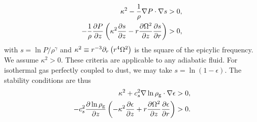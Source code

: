 \begin{align}
  \kappa^2 - \frac{1}{\rho}\nabla P \cdot \nabla s &> 0,\\
  -\frac{1}{\rho}\frac{\partial P}{\partial z} \left(\kappa^2 \frac{\partial s}{\partial z} -
  r\frac{\partial\Omega^2}{\partial z}\frac{\partial s}{\partial r}\right) &>0, 
\end{align}
with $s = \ln{P/\rho^\gamma}$ and 
$\kappa^2 \equiv r^{-3}\partial_r\left(r^4\Omega^2\right)$ is the
square of the epicylic frequency. We assume $\kappa^2>0$. 
These criteria are applicable to any adiabatic fluid. For 
isothermal gas perfectly coupled to dust, we may take 
$s=\ln{(1-\epsilon)}$. 
The stability conditions are thus
\begin{align}
  \kappa^2 + c_s^2 \nabla\ln{\rho_\mathrm{g}}\cdot\nabla\epsilon &> 0,\label{dusty_solberg1}  \\
  -c_s^2\frac{\partial\ln{\rho_\mathrm{g}}}{\partial z}\left(-\kappa^2\frac{\partial\epsilon}{\partial
    z} + r\frac{\partial\Omega^2}{\partial z}\frac{\partial \epsilon}{\partial r} \right) & > 0. \label{dusty_solberg2}
\end{align}



